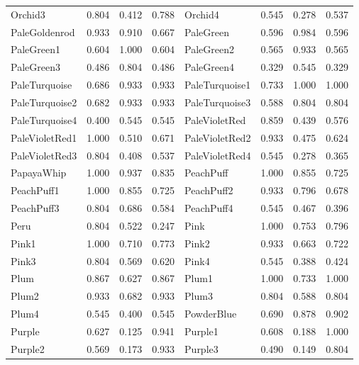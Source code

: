 {\begin{center}
\begin{tabular}{|l|l|l|l|l|l|l|l|}
Orchid3             & 0.804 & 0.412 & 0.788 & Orchid4             & 0.545 & 0.278 & 0.537 \\ 
PaleGoldenrod       & 0.933 & 0.910 & 0.667 & PaleGreen           & 0.596 & 0.984 & 0.596 \\ 
PaleGreen1          & 0.604 & 1.000 & 0.604 & PaleGreen2          & 0.565 & 0.933 & 0.565 \\ 
PaleGreen3          & 0.486 & 0.804 & 0.486 & PaleGreen4          & 0.329 & 0.545 & 0.329 \\ 
PaleTurquoise       & 0.686 & 0.933 & 0.933 & PaleTurquoise1      & 0.733 & 1.000 & 1.000 \\ 
PaleTurquoise2      & 0.682 & 0.933 & 0.933 & PaleTurquoise3      & 0.588 & 0.804 & 0.804 \\ 
PaleTurquoise4      & 0.400 & 0.545 & 0.545 & PaleVioletRed       & 0.859 & 0.439 & 0.576 \\ 
PaleVioletRed1      & 1.000 & 0.510 & 0.671 & PaleVioletRed2      & 0.933 & 0.475 & 0.624 \\ 
PaleVioletRed3      & 0.804 & 0.408 & 0.537 & PaleVioletRed4      & 0.545 & 0.278 & 0.365 \\ 
PapayaWhip          & 1.000 & 0.937 & 0.835 & PeachPuff           & 1.000 & 0.855 & 0.725 \\ 
PeachPuff1          & 1.000 & 0.855 & 0.725 & PeachPuff2          & 0.933 & 0.796 & 0.678 \\ 
PeachPuff3          & 0.804 & 0.686 & 0.584 & PeachPuff4          & 0.545 & 0.467 & 0.396 \\ 
Peru                & 0.804 & 0.522 & 0.247 & Pink                & 1.000 & 0.753 & 0.796 \\ 
Pink1               & 1.000 & 0.710 & 0.773 & Pink2               & 0.933 & 0.663 & 0.722 \\ 
Pink3               & 0.804 & 0.569 & 0.620 & Pink4               & 0.545 & 0.388 & 0.424 \\ 
Plum                & 0.867 & 0.627 & 0.867 & Plum1               & 1.000 & 0.733 & 1.000 \\ 
Plum2               & 0.933 & 0.682 & 0.933 & Plum3               & 0.804 & 0.588 & 0.804 \\ 
Plum4               & 0.545 & 0.400 & 0.545 & PowderBlue          & 0.690 & 0.878 & 0.902 \\ 
Purple              & 0.627 & 0.125 & 0.941 & Purple1             & 0.608 & 0.188 & 1.000 \\ 
Purple2             & 0.569 & 0.173 & 0.933 & Purple3             & 0.490 & 0.149 & 0.804 \\ 

\end{tabular}
\end{center}}
